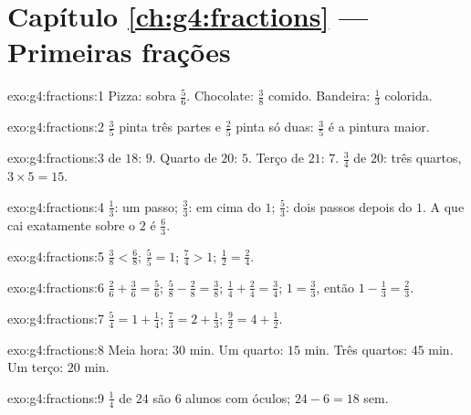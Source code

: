 \section*{Capítulo \ref{ch:g4:fractions} --- Primeiras frações}

\begin{solution}{exo:g4:fractions:1}
Pizza: sobra $\frac56$. Chocolate: $\frac38$ comido. Bandeira:
$\frac13$ colorida.
\end{solution}

\begin{solution}{exo:g4:fractions:2}
$\frac35$ pinta três partes e $\frac25$ pinta só duas: $\frac35$ é a
pintura maior.
\end{solution}

\begin{solution}{exo:g4:fractions:3}
 de $18$: $9$. Quarto de $20$: $5$. Terço de $21$: $7$.
$\frac34$ de $20$: três quartos, $3 \times 5 = 15$.
\end{solution}

\begin{solution}{exo:g4:fractions:4}
$\frac13$: um passo; $\frac33$: em cima do $1$; $\frac53$: dois
passos depois do $1$. A  que cai exatamente sobre o $2$ é
$\frac63$.
\end{solution}

\begin{solution}{exo:g4:fractions:5}
$\frac38 < \frac68$; \quad $\frac55 = 1$; \quad $\frac74 > 1$;
\quad $\frac12 = \frac24$.
\end{solution}

\begin{solution}{exo:g4:fractions:6}
$\frac26 + \frac36 = \frac56$; \quad
$\frac58 - \frac28 = \frac38$; \quad
$\frac14 + \frac24 = \frac34$; \quad
$1 = \frac33$, então $1 - \frac13 = \frac23$.
\end{solution}

\begin{solution}{exo:g4:fractions:7}
$\frac54 = 1 + \frac14$; \quad
$\frac73 = 2 + \frac13$; \quad
$\frac92 = 4 + \frac12$.
\end{solution}

\begin{solution}{exo:g4:fractions:8}
Meia hora: $30$ min. Um quarto: $15$ min. Três quartos: $45$ min. Um
terço: $20$ min.
\end{solution}

\begin{solution}{exo:g4:fractions:9}
$\frac14$ de $24$ são $6$ alunos com óculos; $24 - 6 = 18$ sem.
\end{solution}

